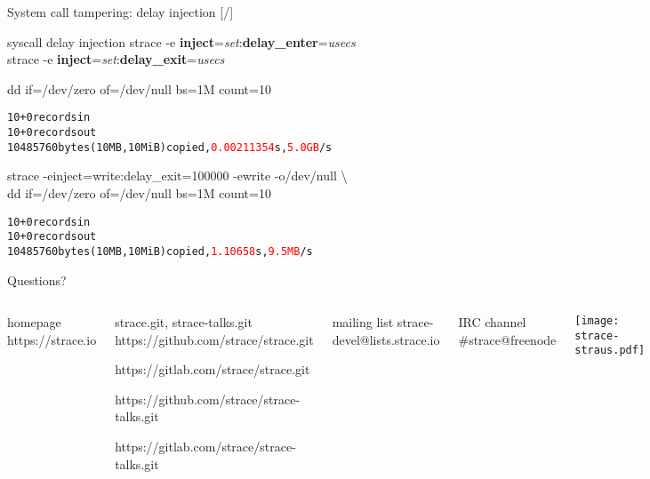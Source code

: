 \documentclass[unicode,aspectratio=169]{beamer}
\begin{document}
\begin{frame}[fragile]{System call tampering: delay injection \hfill [\insertframenumber/\inserttotalframenumber]}
\begin{block}{\large syscall delay injection}
strace -e \textbf{inject}=\textit{set}:\textbf{delay\_enter}=\textit{usecs} \\
strace -e \textbf{inject}=\textit{set}:\textbf{delay\_exit}=\textit{usecs}
\end{block}

\begin{block}{\large dd if=/dev/zero of=/dev/null bs=1M count=10}
\begin{alltt}
10+0 records in
10+0 records out
10485760 bytes (10 MB, 10 MiB) copied, \textcolor{red}{0.00211354} s, \textcolor{red}{5.0 GB}/s
\end{alltt}
\end{block}

\begin{block}{\large strace -einject=write:delay\_exit=100000 -ewrite -o/dev/null \textbackslash\\
dd if=/dev/zero of=/dev/null bs=1M count=10}
\begin{alltt}
10+0 records in
10+0 records out
10485760 bytes (10 MB, 10 MiB) copied, \textcolor{red}{1.10658} s, \textcolor{red}{9.5 MB}/s
\end{alltt}
\end{block}
\end{frame}

{
\begin{frame}{Questions?}
	\begin{columns}
		\column{7cm}
\begin{block}{\large homepage}
	https://strace.io
\end{block}
\begin{block}{\large strace.git, strace-talks.git}
	https://github.com/strace/strace.git

	https://gitlab.com/strace/strace.git

\smallskip

	https://github.com/strace/strace-talks.git

	https://gitlab.com/strace/strace-talks.git
\end{block}
\begin{block}{\large mailing list}
	strace-devel@lists.strace.io
\end{block}
\begin{block}{\large IRC channel}
	\#strace@freenode
\end{block}
		\column{3cm}
			\centerline{\texttt{[image: strace-straus.pdf]}}
	\end{columns}
\end{frame}
}
\end{document}

